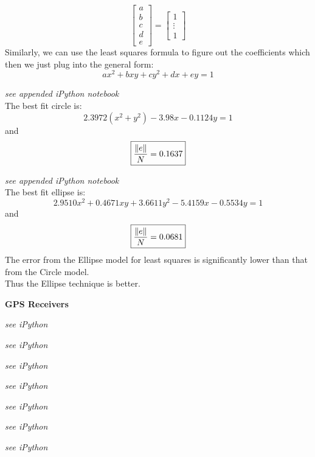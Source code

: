 \documentclass[letter]{article}
\newenvironment{menumerate}{\edef\backupindent{\the\parindent}
  \enumerate\setlength{\parindent}{\backupindent}}
  {\endenumerate}
\begin{document}
\begin{menumerate}
\begin{menumerate}
\begin{equation*}
\begin{bmatrix}
                a\\b\\c\\d\\e
            \end{bmatrix}
            =
            \begin{bmatrix}
                1\\\vdots\\1
            \end{bmatrix}
        \end{equation*}
        Similarly, we can use the least squares formula to figure out the coefficients which then we just plug into the general form:
        \begin{equation*}
            ax^2 + bxy + cy^2 + dx + ey = 1
        \end{equation*}
        \item \emph{see appended iPython notebook}
        \\The best fit circle is:
        \begin{equation*}
            \boxed{2.3972(x^2+y^2) -3.98x -0.1124y = 1}
        \end{equation*}
        and
        \begin{equation*}
            \boxed{\frac{\norm{e}}{N} = 0.1637}
        \end{equation*}
        \item \emph{see appended iPython notebook}
        \\The best fit ellipse is:
        \begin{equation*}
            \boxed{2.9510x^2 + 0.4671xy + 3.6611y^2 -5.4159x -0.5534y = 1}
        \end{equation*}
        and
        \begin{equation*}
            \boxed{\frac{\norm{e}}{N} = 0.0681}
        \end{equation*}
        The error from the Ellipse model for least squares is significantly lower than that from the Circle model.\\
        Thus the Ellipse technique is better.
    \end{menumerate}

    \newpage
    \item \textbf{GPS Receivers}
    \begin{menumerate}
        \item \emph{see iPython}
        \item \emph{see iPython}
        \item \emph{see iPython}
        \item \emph{see iPython}
        \item \emph{see iPython}
        \item \emph{see iPython}
        \item \emph{see iPython}
    \end{menumerate}


\end{menumerate}
\end{document}
